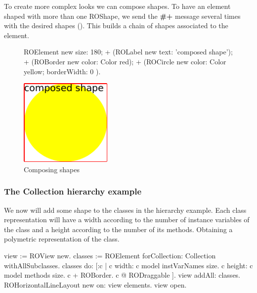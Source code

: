 \documentclass[a4paper,10pt,twoside]{book}
\begin{document}
To create more complex looks we can compose shapes. To have an element shaped with more than one ROShape, we send the \textbf{\#+} message several times with the desired shapes (). This builds a chain of shapes associated to the element.

\begin{figure}[H]
      \begin{minipage}[t]{0.5\textwidth}
      \vspace{0pt}
     \begin{code}
     
ROElement new 
	size: 180;  
	+ (ROLabel new text: 'composed shape');
	+ (ROBorder new color: Color red); 
	+ (ROCircle new color: Color yellow; 
					borderWidth: 0 ).	\end{code}
   \end{minipage}
   \hfill
   \begin{minipage}[t]{0.4\textwidth}
      \vspace{0pt} \raggedright
       \centering
		\includegraphics[width=0.4\textwidth]{composed}
   \end{minipage}
\caption{Composing shapes}
\label{fig:composed}
\end{figure} 

\subsubsection*{The Collection hierarchy example}
We now will add some shape to the classes in the  hierarchy example. Each class representation will have a width according to the number of instance variables of the class and a height according to the number of its methods. Obtaining a polymetric representation of the class.

\begin{code}{}
view := ROView new.
classes := ROElement forCollection: Collection withAllSubclasses.
classes do: [:c | 
	c width: c model instVarNames size.
	c height: c model methods size.
	c + ROBorder. 
	c @ RODraggable ].
view addAll: classes.
ROHorizontalLineLayout new on: view elements.
view open.
\end{code}
\end{document}
